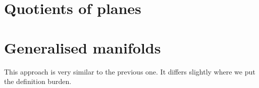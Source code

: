 \section{Quotients of planes}

\section{Generalised manifolds}
This approach is very similar to the previous one. It differs slightly where we put the 
definition burden. 


